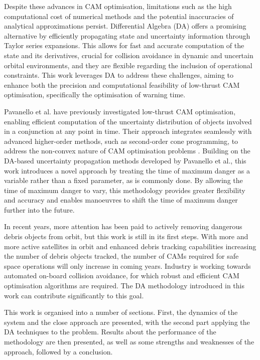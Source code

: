 \documentclass[letterpaper, preprint, paper,11pt]{AAS}	%
\begin{document}
Despite these advances in CAM optimisation, limitations such as the high computational cost of numerical methods and the potential inaccuracies of analytical approximations persist. Differential Algebra (DA) offers a promising alternative by efficiently propagating state and uncertainty information through Taylor series expansions. This allows for fast and accurate computation of the state and its derivatives, crucial for collision avoidance in dynamic and uncertain orbital environments, and they are flexible regarding the inclusion of operational constraints. This work leverages DA to address these challenges, aiming to enhance both the precision and computational feasibility of low-thrust CAM optimisation, specifically the optimisation of warning time.

Pavanello et al. have previously investigated low-thrust CAM optimisation, enabling efficient computation of the uncertainty distribution of objects involved in a conjunction at any point in time. Their approach integrates seamlessly with advanced higher-order methods, such as second-order cone programming, to address the non-convex nature of CAM optimisation problems \cite{pavanello2024b}. Building on the DA-based uncertainty propagation methods developed by Pavanello et al., this work introduces a novel approach by treating the time of maximum danger as a variable rather than a fixed parameter, as is commonly done. By allowing the time of maximum danger to vary, this methodology provides greater flexibility and accuracy and enables manoeuvres to shift the time of maximum danger further into the future.


In recent years, more attention has been paid to actively removing dangerous debris objects from orbit, but this work is still in its first steps. With more and more active satellites in orbit and enhanced debris tracking capabilities increasing the number of debris objects tracked, the number of CAMs required for safe space operations will only increase in coming years. Industry is working towards automated on-board collision avoidance, for which robust and efficient CAM optimisation algorithms are required. The DA methodology introduced in this work can contribute significantly to this goal.


This work is organised into a number of sections. First, the dynamics of the system and the close approach are presented, with the second part applying the DA techniques to the problem. Results about the performance of the methodology are then presented, as well as some strengths and weaknesses of the approach, followed by a conclusion.
\end{document}
